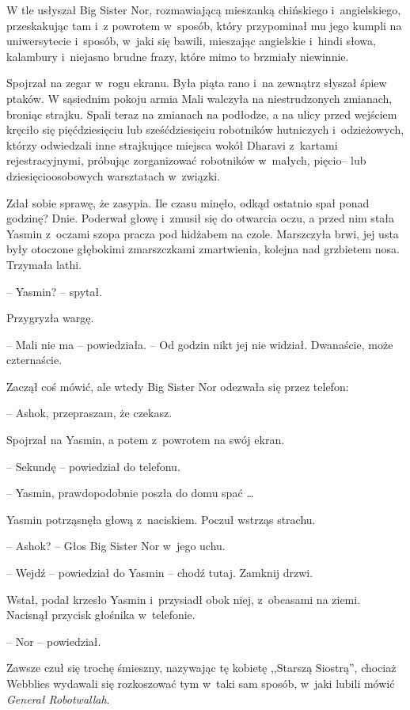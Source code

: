 \documentclass[oneside,polish,11pt,rmheadings]{mwbk}
\begin{document}
W tle usłyszał Big Sister Nor, rozmawiającą mieszanką chińskiego i~angielskiego, przeskakując tam i~z powrotem w~sposób, który przypominał mu jego kumpli na uniwersytecie i~sposób, w~jaki się bawili, mieszając angielskie i~hindi słowa, kalambury i~niejasno brudne frazy, które mimo to brzmiały niewinnie.

Spojrzał na zegar w~rogu ekranu. Była piąta rano i~na zewnątrz słyszał śpiew ptaków. W sąsiednim pokoju armia Mali walczyła na niestrudzonych zmianach, broniąc strajku. Spali teraz na zmianach na podłodze, a na ulicy przed wejściem kręciło się pięćdziesięciu lub sześćdziesięciu robotników hutniczych i~odzieżowych, którzy odwiedzali inne strajkujące miejsca wokół Dharavi z~kartami rejestracyjnymi, próbując zorganizować robotników w~małych, pięcio-- lub dziesięcioosobowych warsztatach w~związki.

Zdał sobie sprawę, że zasypia. Ile czasu minęło, odkąd ostatnio spał ponad godzinę? Dnie. Poderwał głowę i~zmusił się do otwarcia oczu, a przed nim stała Yasmin z~oczami szopa pracza pod hidżabem na czole. Marszczyła brwi, jej usta były otoczone głębokimi zmarszczkami zmartwienia, kolejna nad grzbietem nosa. Trzymała lathi.

-- Yasmin? -- spytał.

Przygryzła wargę. 

-- Mali nie ma -- powiedziała. -- Od godzin nikt jej nie widział. Dwanaście, może czternaście.

Zaczął coś mówić, ale wtedy Big Sister Nor odezwała się przez telefon: 

-- Ashok, przepraszam, że czekasz.

Spojrzał na Yasmin, a potem z~powrotem na swój ekran. 

-- Sekundę -- powiedział do telefonu.

-- Yasmin, prawdopodobnie poszła do domu spać \ldots 

Yasmin potrząsnęła głową z~naciskiem. Poczuł wstrząs strachu. 

-- Ashok? -- Głos Big Sister Nor w~jego uchu.

-- Wejdź -- powiedział do Yasmin -- chodź tutaj. Zamknij drzwi.

Wstał, podał krzesło Yasmin i~przysiadł obok niej, z~obcasami na ziemi. Nacisnął przycisk głośnika w~telefonie.

-- Nor -- powiedział. 

Zawsze czuł się trochę śmieszny, nazywając tę kobietę ,,Starszą Siostrą'', chociaż Webblies wydawali się rozkoszować tym w~taki sam sposób, w~jaki lubili mówić \textit{Generał Robotwallah}.
\end{document}
